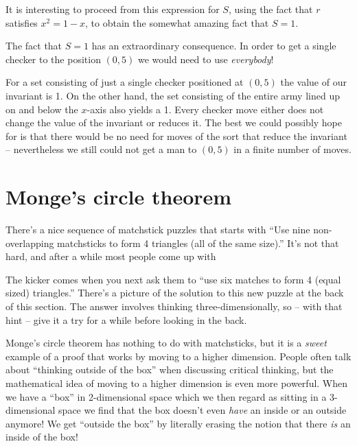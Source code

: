 It is interesting to proceed from this expression for $S$,
using the fact that $r$ satisfies $x^2 = 1 - x$, to obtain the somewhat
amazing fact that $S=1$. 

The fact that $S=1$ has an extraordinary consequence.
In order to get a single
checker to the position $(0,5)$ we would need to use \emph{everybody}!

For a set consisting of just a single
checker positioned at $(0,5)$ the value of our invariant is 1.
On the other hand, the set consisting of the entire army lined 
up on and below the $x$-axis also yields a 1.  Every checker move either
does not change the value of the invariant or reduces it.  The best 
we could possibly hope for is that there would be no need for moves 
of the sort that reduce
the invariant -- nevertheless we still could not get a man to $(0,5)$ 
in a finite number of moves.

\clearpage




\newpage

\section{Monge's circle theorem}
\label{sec:monge}

There's a nice sequence of matchstick puzzles that starts with
``Use nine non-overlapping matchsticks to form 4 triangles (all of
the same size).''  It's not that hard, and after a while most people come
up with 


\begin{center}

\end{center}

The kicker comes when you next ask them to ``use six matches to form
4 (equal sized) triangles.''   There's a picture of the solution to
this new puzzle at the back of this section.  The answer involves 
thinking three-dimensionally, so -- with that hint -- give it a try for a
while before looking in the back.

Monge's circle theorem has 
nothing to do with matchsticks, but it is a
\emph{sweet} example of a proof that works by moving to a higher dimension.
People often talk about ``thinking outside of the box'' when discussing
critical thinking, but the mathematical idea of moving to a higher dimension
is even more powerful.  When we have a ``box'' in 2-dimensional space which
we then regard as sitting in a 3-dimensional space we find that the box
doesn't even \emph{have} an inside or an outside anymore!  We get ``outside 
the box'' by literally erasing the notion that there \emph{is} an inside
of the box!

